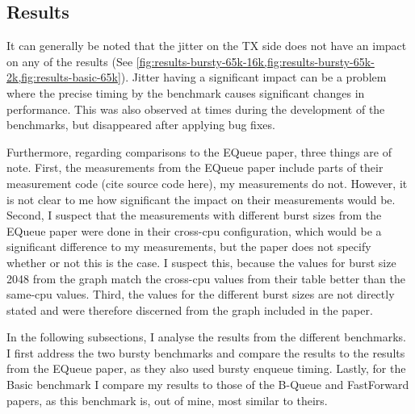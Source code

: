 \subsection{Results}
It can generally be noted that the jitter on the TX side does not have an impact on any of the results
(See \cref{fig:results-bursty-65k-16k,fig:results-bursty-65k-2k,fig:results-basic-65k}).
Jitter having a significant impact can be a problem where the precise timing by the benchmark causes significant changes in performance.
This was also observed at times during the development of the benchmarks, but disappeared after applying bug fixes.

Furthermore, regarding comparisons to the EQueue paper, three things are of note.
First, the measurements from the EQueue paper include parts of their measurement code (cite source code here), my measurements do not.
However, it is not clear to me how significant the impact on their measurements would be.
Second, I suspect that the measurements with different burst sizes from the EQueue paper were done in their cross-cpu configuration,
which would be a significant difference to my measurements, but the paper does not specify whether or not this is the case.
I suspect this, because the values for burst size 2048 from the graph match the cross-cpu values from their table better than the same-cpu values.
Third, the values for the different burst sizes are not directly stated and were therefore discerned from the graph included in the paper.

In the following subsections, I analyse the results from the different benchmarks.
I first address the two bursty benchmarks and compare the results to the results from the EQueue paper, as they also used bursty enqueue timing.
Lastly, for the Basic benchmark I compare my results to those of the B-Queue and FastForward papers, as this benchmark is, out of mine, most similar to theirs.






